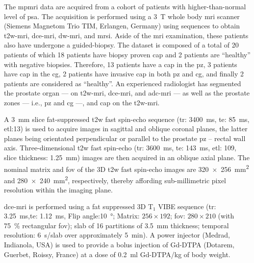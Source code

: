 The \ac{mpmri} data are acquired from a cohort of patients with higher-than-normal level of \ac{psa}.
The acquisition is performed using a \SI{3}{\tesla} whole body \ac{mri} scanner (Siemens Magnetom Trio TIM, Erlangen, Germany) using sequences to obtain \ac{t2w}-\ac{mri}, \ac{dce}-\ac{mri}, \ac{dw}-\ac{mri}, and \ac{mrsi}.
Aside of the \ac{mri} examination, these patients also have undergone a guided-biopsy.
The dataset is composed of a total of 20 patients of which 18 patients have biopsy proven \ac{cap} and 2 patients are ``healthy'' with negative biopsies.
Therefore, 13 patients have a \ac{cap} in the \ac{pz}, 3 patients have \ac{cap} in the \ac{cg}, 2 patients have invasive \ac{cap} in both \ac{pz} and \ac{cg}, and finally 2 patients are considered as ``healthy''.
An experienced radiologist has segmented the prostate organ --- on \ac{t2w}-\ac{mri}, \ac{dce}-\ac{mri}, and \ac{adc}-\ac{mri} --- as well as the prostate zones --- i.e., \ac{pz} and \ac{cg} ---, and \ac{cap} on the \ac{t2w}-\ac{mri}.

A \SI{3}{\mm} slice fat-suppressed \ac{t2w} fast spin-echo sequence (\ac{tr}: \SI{3400}{\ms}, \ac{te}: \SI{85}{\ms}, \ac{etl}:13) is used to acquire images in sagittal and oblique coronal planes, the latter planes being orientated perpendicular or parallel to the prostate \ac{pz} – rectal wall axis.
Three-dimensional \ac{t2w} fast spin-echo (\ac{tr}: \SI{3600}{\ms}, \ac{te}: \SI{143}{\ms}, \ac{etl}: 109, slice thickness: \SI{1.25}{\mm}) images are then acquired in an oblique axial plane.
The nominal matrix and \ac{fov} of the 3D \ac{t2w} fast spin-echo images are \SI[product-units=repeat]{320x256}{\milli\metre\squared} and \SI[product-units=repeat]{280x240}{\milli\metre\squared}, respectively, thereby affording sub-millimetric pixel resolution within the imaging plane.

\ac{dce}-\ac{mri} is performed using a fat suppressed 3D T$_1$ VIBE sequence (\ac{tr}: \SI{3.25}{\ms},\ac{te}: \SI{1.12}{\ms}, Flip angle:\SI{10}{\degree}; Matrix: $256 \times 192$; \ac{fov}: $280 \times 210$ (with \SI{75}{\percent} rectangular \ac{fov}); slab of 16 partitions of \SI{3.5}{\mm} thickness; temporal resolution: \SI{6}{\s}/slab over approximately \SI{5}{\minute}).
A power injector (Medrad, Indianola, USA) is used to provide a bolus injection of Gd-DTPA (Dotarem, Guerbet, Roissy, France) at a dose of \SI{0.2}{\ml} Gd-DTPA/kg of body weight.

